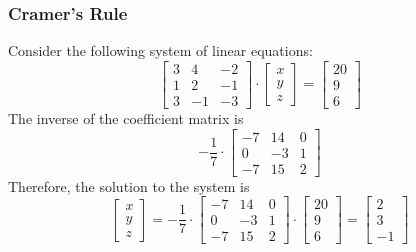 \documentclass[xcolor=dvipsnames]{beamer}
\begin{document}
\begin{frame}
  \frametitle{Cramer's Rule}
  Consider the following system of linear
  equations:
  \begin{equation}
    \label{eq:keiyikae}
    \left[
      \begin{array}{ccc}
        3 & 4 & -2 \\
        1 & 2 & -1 \\
        3 & -1 & -3
      \end{array}\right]\cdot\left[
      \begin{array}{c}
        x \\
        y \\
        z
      \end{array}\right]=\left[
      \begin{array}{c}
        20 \\
        9 \\
        6
      \end{array}\right]
  \end{equation}
  The inverse of the coefficient matrix is
  \begin{equation}
    \label{eq:phiedier}
    -\frac{1}{7}\cdot\left[
      \begin{array}{ccc}
        -7 & 14 & 0 \\
        0 & -3 & 1 \\
        -7 & 15 & 2
      \end{array}\right]
  \end{equation}
  Therefore, the solution to the system is
  \begin{equation}
    \label{eq:suchociw}
    \left[
      \begin{array}{c}
        x \\
        y \\
        z
      \end{array}\right]=-\frac{1}{7}\cdot\left[
      \begin{array}{ccc}
        -7 & 14 & 0 \\
        0 & -3 & 1 \\
        -7 & 15 & 2
      \end{array}\right]\cdot\left[
      \begin{array}{c}
        20 \\
        9 \\
        6
      \end{array}\right]=\left[
      \begin{array}{c}
        2 \\
        3 \\
        -1
      \end{array}\right]
  \end{equation}
\end{frame}
\end{document}
